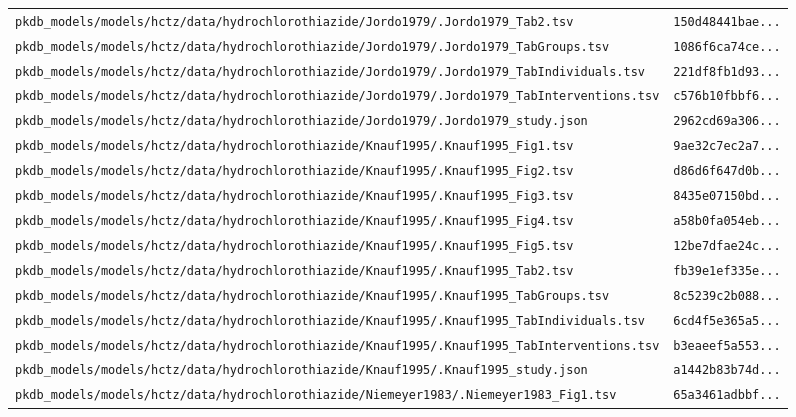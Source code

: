 \documentclass{article}
\begin{document}
\begin{longtable}{ll}
\texttt{pkdb\_models/models/hctz/data/hydrochlorothiazide/Jordo1979/.Jordo1979\_Tab2.tsv} & \texttt{150d48441bae...} \\
\texttt{pkdb\_models/models/hctz/data/hydrochlorothiazide/Jordo1979/.Jordo1979\_TabGroups.tsv} & \texttt{1086f6ca74ce...} \\
\texttt{pkdb\_models/models/hctz/data/hydrochlorothiazide/Jordo1979/.Jordo1979\_TabIndividuals.tsv} & \texttt{221df8fb1d93...} \\
\texttt{pkdb\_models/models/hctz/data/hydrochlorothiazide/Jordo1979/.Jordo1979\_TabInterventions.tsv} & \texttt{c576b10fbbf6...} \\
\texttt{pkdb\_models/models/hctz/data/hydrochlorothiazide/Jordo1979/.Jordo1979\_study.json} & \texttt{2962cd69a306...} \\
\texttt{pkdb\_models/models/hctz/data/hydrochlorothiazide/Knauf1995/.Knauf1995\_Fig1.tsv} & \texttt{9ae32c7ec2a7...} \\
\texttt{pkdb\_models/models/hctz/data/hydrochlorothiazide/Knauf1995/.Knauf1995\_Fig2.tsv} & \texttt{d86d6f647d0b...} \\
\texttt{pkdb\_models/models/hctz/data/hydrochlorothiazide/Knauf1995/.Knauf1995\_Fig3.tsv} & \texttt{8435e07150bd...} \\
\texttt{pkdb\_models/models/hctz/data/hydrochlorothiazide/Knauf1995/.Knauf1995\_Fig4.tsv} & \texttt{a58b0fa054eb...} \\
\texttt{pkdb\_models/models/hctz/data/hydrochlorothiazide/Knauf1995/.Knauf1995\_Fig5.tsv} & \texttt{12be7dfae24c...} \\
\texttt{pkdb\_models/models/hctz/data/hydrochlorothiazide/Knauf1995/.Knauf1995\_Tab2.tsv} & \texttt{fb39e1ef335e...} \\
\texttt{pkdb\_models/models/hctz/data/hydrochlorothiazide/Knauf1995/.Knauf1995\_TabGroups.tsv} & \texttt{8c5239c2b088...} \\
\texttt{pkdb\_models/models/hctz/data/hydrochlorothiazide/Knauf1995/.Knauf1995\_TabIndividuals.tsv} & \texttt{6cd4f5e365a5...} \\
\texttt{pkdb\_models/models/hctz/data/hydrochlorothiazide/Knauf1995/.Knauf1995\_TabInterventions.tsv} & \texttt{b3eaeef5a553...} \\
\texttt{pkdb\_models/models/hctz/data/hydrochlorothiazide/Knauf1995/.Knauf1995\_study.json} & \texttt{a1442b83b74d...} \\
\texttt{pkdb\_models/models/hctz/data/hydrochlorothiazide/Niemeyer1983/.Niemeyer1983\_Fig1.tsv} & \texttt{65a3461adbbf...} \\

\end{longtable}
\end{document}
